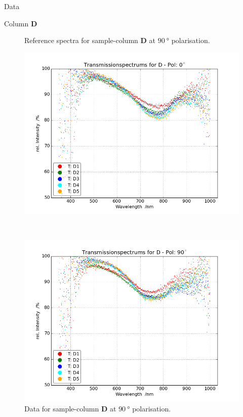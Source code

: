\begin{appendix}
\begin{chapter}{Data}
\begin{section}{Column \textbf{D}}
\begin{figure}[ht!]
\begin{minipage}{.92\textwidth}
          \caption{Reference spectra for sample-column \textbf{D} at
              $\SI{90}{\degree}$ polarisation.}
          \label{fig:Refspec_DPol90}
        \end{minipage}
      \end{figure}
      \newpage
      \begin{figure}[ht!]
        \centering
        \begin{minipage}{.92\textwidth}
          \centering
          \includegraphics[width=\textwidth]{Figures/TransspecRAW_DPol0.png}
          \caption{Data for sample-column \textbf{D} at $\SI{0}{\degree}$
              polarisation.}
          \label{fig:TransspecRAW_DPol0}
        \end{minipage}\\
        \begin{minipage}{.92\textwidth}
          \centering
          \includegraphics[width=\textwidth]{Figures/TransspecRAW_DPol90.png}
          \caption{Data for sample-column \textbf{D} at $\SI{90}{\degree}$
              polarisation.}
          \label{fig:TransspecRAW_DPol90}
        \end{minipage}
      \end{figure}
      

\end{section}
\end{chapter}
\end{appendix}

